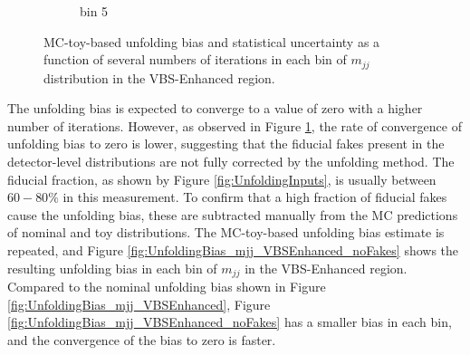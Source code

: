 \begin{figure}[htb]
\begin{subfigure}{.48\textwidth}
        \caption{bin 5 }
    \end{subfigure}
    \caption{ MC-toy-based unfolding bias and statistical uncertainty as a function of several numbers of iterations in each bin of $m_{jj}$ distribution in the VBS-Enhanced region. \label{fig:UnfoldingBiasStat_mjj_VBSEnhanced}}
\end{figure}

The unfolding bias is expected to converge to a value of zero with a higher number of iterations. However, as observed in Figure \ref{fig:UnfoldingBiasStat_mjj_VBSEnhanced}, the rate of convergence of unfolding bias to zero is lower, suggesting that the fiducial fakes present in the detector-level distributions are not fully corrected by the unfolding method. The fiducial fraction, as shown by Figure \ref{fig:UnfoldingInputs}, is usually between $60-80\%$ in this measurement. To confirm that a high fraction of fiducial fakes cause the unfolding bias, these are subtracted manually from the MC predictions of nominal and toy distributions. The MC-toy-based unfolding bias estimate is repeated, and Figure \ref{fig:UnfoldingBias_mjj_VBSEnhanced_noFakes} shows the resulting unfolding bias in each bin of $m_{jj}$ in the VBS-Enhanced region. Compared to the nominal unfolding bias shown in Figure \ref{fig:UnfoldingBias_mjj_VBSEnhanced}, Figure \ref{fig:UnfoldingBias_mjj_VBSEnhanced_noFakes} has a smaller bias in each bin, and the convergence of the bias to zero is faster.


